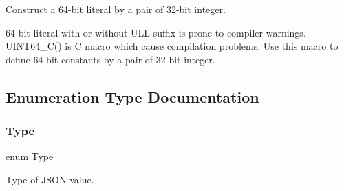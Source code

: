 Construct a 64-\/bit literal by a pair of 32-\/bit integer. 

64-\/bit literal with or without U\+LL suffix is prone to compiler warnings. U\+I\+N\+T64\+\_\+\+C() is C macro which cause compilation problems. Use this macro to define 64-\/bit constants by a pair of 32-\/bit integer. 

\subsection{Enumeration Type Documentation}
\mbox{\label{a00560_a1d1cfd8ffb84e947f82999c682b666a7}} 
\subsubsection{\texorpdfstring{Type}{Type}}
{\footnotesize\ttfamily enum \hyperlink{a00560_a1d1cfd8ffb84e947f82999c682b666a7}{Type}}



Type of J\+S\+ON value. 

